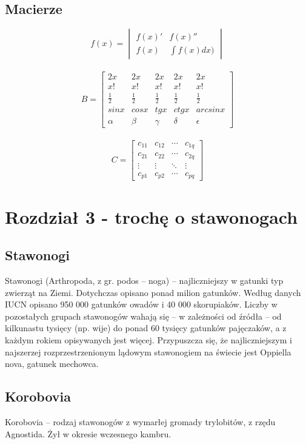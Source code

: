 \documentclass{article}
\begin{document}
\subsection{Macierze}

$$f(x)=\begin{vmatrix}
{f(x)}' & {f(x)}''\\ 
f(x) & \int f(x)dx)
\end{vmatrix}$$
\\
$$B = \begin{bmatrix}
2x & 2x & 2x & 2x & 2x\\ 
x! & x! & x! & x! & x!\\ 
\frac{1}{2} & \frac{1}{2} & \frac{1}{2} & \frac{1}{2} & \frac{1}{2}\\ 
sinx & cosx & tgx & ctgx & arcsinx\\ 
\alpha  & \beta  & \gamma  & \delta  & \epsilon 
\end{bmatrix}$$
\\
$$C=\left[ \begin{array}{cccc}
c_{11} & c_{12} & \cdots & c_{1q} \\
c_{21} & c_{22} & \cdots & c_{2q} \\
\vdots & \vdots & \ddots & \vdots \\
c_{p1} & c_{p2} & \cdots & c_{pq}
\end{array} \right]$$

\newpage
\section{Rozdział 3 - trochę o stawonogach}
\subsection{Stawonogi}
Stawonogi (Arthropoda\footnotemark, z gr. podos – noga) – najliczniejszy w gatunki typ zwierząt na Ziemi. Dotychczas opisano ponad milion gatunków. Według danych IUCN opisano 950 000 gatunków owadów i 40 000 skorupiaków. Liczby w pozostałych grupach stawonogów wahają się – w zależności od źródła – od kilkunastu tysięcy (np. wije) do ponad 60 tysięcy gatunków pajęczaków, a z każdym rokiem opisywanych jest więcej. 
Przypuszcza się, że najliczniejszym i najszerzej rozprzestrzenionym lądowym stawonogiem na świecie jest Oppiella nova, gatunek mechowca\footnotemark. 
\subsection{Korobovia}
Korobovia – rodzaj stawonogów z wymarłej gromady trylobitów, z rzędu Agnostida\footnotemark. Żył w okresie wczesnego kambru\footnotemark.
\end{document}
